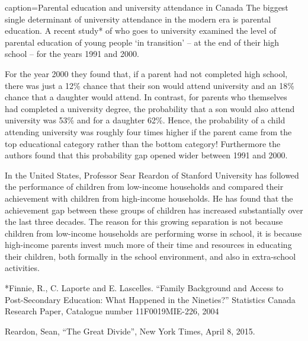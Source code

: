\begin{ApplicationBox}{caption={Parental education and  university attendance in Canada \label{app:parentedcanada}}}
	The biggest single determinant of university attendance in the modern era is parental education. A recent study* of who goes to university examined the level of parental education of young people `in transition' -- at the end of their high school -- for the years 1991 and 2000. 

	For the year 2000 they found that, if a parent had not completed high school, there was just a 12\% chance that their son would attend university and an 18\% chance that a daughter would attend.  In contrast, for parents who themselves had completed a university degree, the probability that a son would also attend university was 53\% and for a daughter 62\%. Hence, the probability of a child attending university was roughly four times higher if the parent came from the top educational category rather than the bottom category! Furthermore the authors found that this probability gap opened wider between 1991 and 2000.

	In the United States, Professor Sear Reardon of Stanford University has followed the performance of children from low-income households and compared their achievement with children from high-income households. He has found that the achievement gap between these groups of children has increased substantially over the last three decades. The reason for this growing separation is not because children from low-income households are performing worse in school, it is because high-income parents invest much more of their time and resources in educating their children, both formally in the school environment, and also in extra-school activities.

	*Finnie, R., C. Laporte and E. Lascelles. ``Family Background and Access to Post-Secondary Education: What Happened in the Nineties?'' Statistics Canada Research Paper, Catalogue number 11F0019MIE-226, 2004
	
	Reardon, Sean, ``The Great Divide'', New York Times, April 8, 2015.
\end{ApplicationBox}
